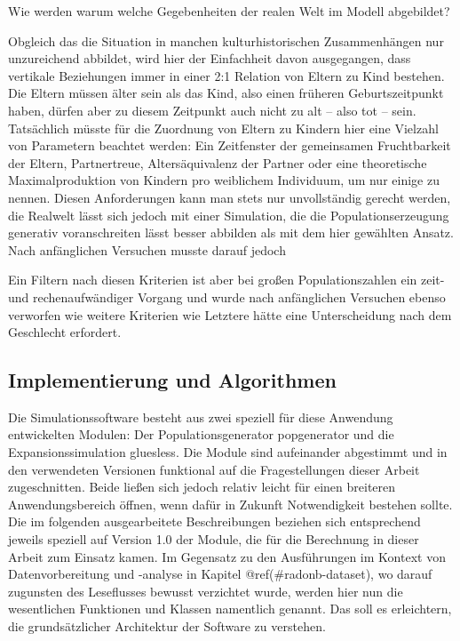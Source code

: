 \documentclass[openany,twoside,twocolumn]{book}
\begin{document}
Wie werden warum welche Gegebenheiten der realen Welt im Modell
abgebildet?

Obgleich das die Situation in manchen kulturhistorischen Zusammenhängen
nur unzureichend abbildet, wird hier der Einfachheit davon ausgegangen,
dass vertikale Beziehungen immer in einer 2:1 Relation von Eltern zu
Kind bestehen. Die Eltern müssen älter sein als das Kind, also einen
früheren Geburtszeitpunkt haben, dürfen aber zu diesem Zeitpunkt auch
nicht zu alt -- also tot -- sein. Tatsächlich müsste für die Zuordnung
von Eltern zu Kindern hier eine Vielzahl von Parametern beachtet werden:
Ein Zeitfenster der gemeinsamen Fruchtbarkeit der Eltern, Partnertreue,
Altersäquivalenz der Partner oder eine theoretische Maximalproduktion
von Kindern pro weiblichem Individuum, um nur einige zu nennen. Diesen
Anforderungen kann man stets nur unvollständig gerecht werden, die
Realwelt lässt sich jedoch mit einer Simulation, die die
Populationserzeugung generativ voranschreiten lässt besser abbilden als
mit dem hier gewählten Ansatz. Nach anfänglichen Versuchen musste darauf
jedoch

Ein Filtern nach diesen Kriterien ist aber bei großen Populationszahlen
ein zeit- und rechenaufwändiger Vorgang und wurde nach anfänglichen
Versuchen ebenso verworfen wie weitere Kriterien wie Letztere hätte eine
Unterscheidung nach dem Geschlecht erfordert.

\hypertarget{implementierung-und-algorithmen}{%
\subsection{Implementierung und
Algorithmen}\label{implementierung-und-algorithmen}}

Die Simulationssoftware besteht aus zwei speziell für diese Anwendung
entwickelten Modulen: Der Populationsgenerator popgenerator und die
Expansionssimulation gluesless. Die Module sind aufeinander abgestimmt
und in den verwendeten Versionen funktional auf die Fragestellungen
dieser Arbeit zugeschnitten. Beide ließen sich jedoch relativ leicht für
einen breiteren Anwendungsbereich öffnen, wenn dafür in Zukunft
Notwendigkeit bestehen sollte. Die im folgenden ausgearbeitete
Beschreibungen beziehen sich entsprechend jeweils speziell auf Version
1.0 der Module, die für die Berechnung in dieser Arbeit zum Einsatz
kamen. Im Gegensatz zu den Ausführungen im Kontext von Datenvorbereitung
und -analyse in Kapitel @ref(\#radonb-dataset), wo darauf zugunsten des
Leseflusses bewusst verzichtet wurde, werden hier nun die wesentlichen
Funktionen und Klassen namentlich genannt. Das soll es erleichtern, die
grundsätzlicher Architektur der Software zu verstehen.
\end{document}
